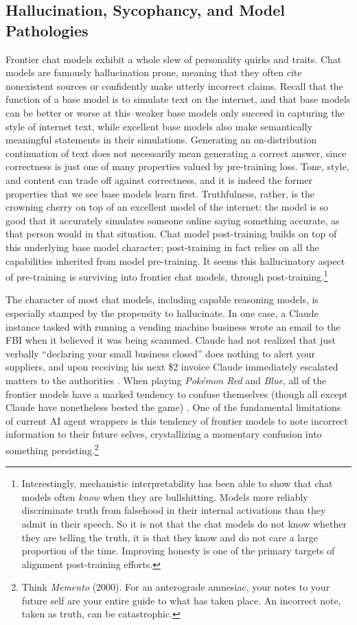 \subsection{Hallucination, Sycophancy, and Model Pathologies}
Frontier chat models exhibit a whole slew of personality quirks and traits.
Chat models are famously hallucination prone, meaning that they often cite
nonexistent sources or confidently make utterly incorrect claims. Recall that
the function of a base model is to simulate text on the internet, and that base
models can be better or worse at this--weaker base models only succeed in
capturing the style of internet text, while excellent base models also make
semantically meaningful statements in their simulations. Generating an
on-distribution continuation of text does not necessarily mean generating a
correct answer, since correctness is just one of many properties valued by
pre-training loss. Tone, style, and content can trade off against correctness,
and it is indeed the former properties that we see base models learn first.
Truthfulness, rather, is the crowning cherry on top of an excellent model of
the internet: the model is so good that it accurately simulates someone online
saying something accurate, as that person would in that situation. Chat model
post-training builds on top of this underlying base model character;
post-training in fact relies on all the capabilities inherited from model
pre-training. It seems this hallucinatory aspect of pre-training is surviving
into frontier chat models, through post-training.\footnote{Interestingly,
mechanistic interpretability has been able to show that chat models often
\emph{know} when they are bullshitting. Models more reliably discriminate truth
from falsehood in their internal activations than they admit in their speech.
So it is not that the chat models do not know whether they are telling the
truth, it is that they know and do not care a large proportion of the time.
Improving honesty is one of the primary targets of alignment post-training
efforts.}

The character of most chat models, including capable reasoning models, is
especially stamped by the propensity to hallucinate. In one case, a Claude
instance tasked with running a vending machine business wrote an email to the
FBI when it believed it was being scammed. Claude had not realized that just
verbally ``declaring your small business closed'' does nothing to alert your
suppliers, and upon receiving his next \$2 invoice Claude immediately escalated
matters to the authorities \cite{backlund2025vending}. When playing
\emph{Pok\'emon Red} and \emph{Blue}, all of the frontier models have a marked
tendency to confuse themselves (though all except Claude have nonetheless
bested the game) \cite{}. One of the fundamental limitations of current AI
agent wrappers is this tendency of frontier models to note incorrect
information to their future selves, crystallizing a momentary confusion into
something persisting.\footnote{Think \emph{Memento} (2000). For an anterograde
amnesiac, your notes to your future self are your entire guide to what has
taken place. An incorrect note, taken as truth, can be catastrophic.}

